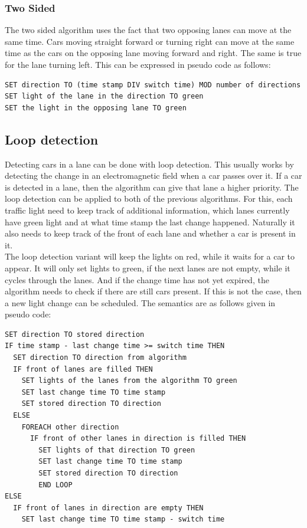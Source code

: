 \documentclass[a4paper,11pt]{article}
\begin{document}
\subsubsection*{Two Sided}
The two sided algorithm uses the fact that two opposing lanes can move at the same time.
Cars moving straight forward or turning right can move at the same time as the cars on the opposing lane moving forward and right.
The same is true for the lane turning left.
This can be expressed in pseudo code as follows:

\begin{lstlisting}
SET direction TO (time stamp DIV switch time) MOD number of directions
SET light of the lane in the direction TO green
SET the light in the opposing lane TO green
\end{lstlisting}

\subsection*{Loop detection}
Detecting cars in a lane can be done with loop detection.
This usually works by detecting the change in an electromagnetic field when a car passes over it.
If a car is detected in a lane, then the algorithm can give that lane a higher priority.
The loop detection can be applied to both of the previous algorithms.
For this, each traffic light need to keep track of additional information, which lanes currently have green light
and at what time stamp the last change happened.
Naturally it also needs to keep track of the front of each lane and whether a car is present in it.\\

\noindent The loop detection variant will keep the lights on red, while it waits for a car to appear.
It will only set lights to green, if the next lanes are not empty, while it cycles through the lanes.
And if the change time has not yet expired, the algorithm needs to check if there are still cars present.
If this is not the case, then a new light change can be scheduled.
The semantics are as follows given in pseudo code:

\begin{lstlisting}
SET direction TO stored direction
IF time stamp - last change time >= switch time THEN
  SET direction TO direction from algorithm
  IF front of lanes are filled THEN
    SET lights of the lanes from the algorithm TO green
    SET last change time TO time stamp
    SET stored direction TO direction
  ELSE
    FOREACH other direction
      IF front of other lanes in direction is filled THEN
        SET lights of that direction TO green
        SET last change time TO time stamp
        SET stored direction TO direction
        END LOOP
ELSE
  IF front of lanes in direction are empty THEN
    SET last change time TO time stamp - switch time
\end{lstlisting}
\end{document}
